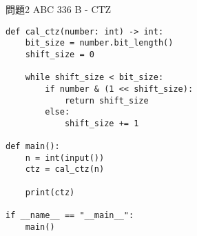 \documentclass{jlreq}
\begin{document}
問題2 ABC 336 B - CTZ
\begin{lstlisting}[caption=問題2の解答, frame=TRBL, label={problem2}]
def cal_ctz(number: int) -> int:
    bit_size = number.bit_length()
    shift_size = 0
    
    while shift_size < bit_size:
        if number & (1 << shift_size):
            return shift_size
        else:
            shift_size += 1

def main():
    n = int(input())
    ctz = cal_ctz(n)
    
    print(ctz)
        
if __name__ == "__main__":
    main()
\end{lstlisting}
\end{document}
